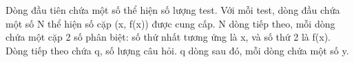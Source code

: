 Dòng đầu tiên chứa một số thể hiện số lượng test. Với mỗi test, dòng đầu chứa một số N thể hiện số cặp (x, f(x)) được cung cấp. N dòng tiếp theo, mỗi dòng chứa một cặp 2 số phân biệt: số thứ nhất tương ứng là x, và số thứ 2 là f(x). Dòng tiếp theo chứa q, số lượng câu hỏi. q dòng sau đó, mỗi dòng chứa một số y.